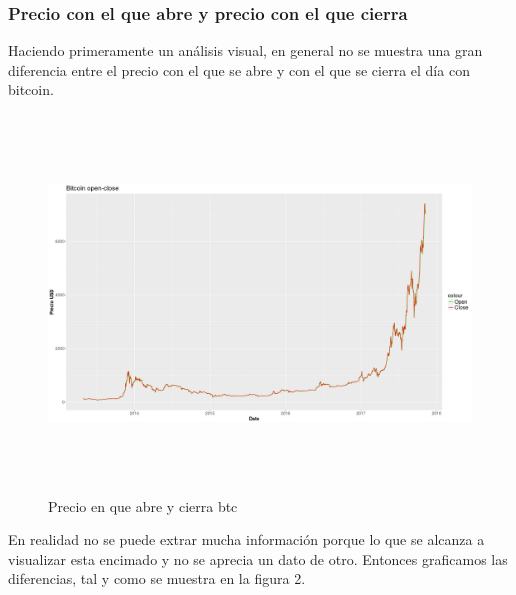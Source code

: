 \documentclass[12pt,letterpaper]{article}
\begin{document}
    \subsubsection*{Precio con el que abre y precio con el que cierra}

    Haciendo primeramente un an\'alisis visual, en general no se muestra una gran diferencia entre el precio con el que se abre y con el que se cierra el día con bitcoin.
    \\
    
    \begin{figure}
        \centering

        \includegraphics[width = 18cm, height = 10cm]{btc/date_vs_open-close}

        \caption{Precio en que abre y cierra btc}
    \end{figure}

    En realidad no se puede extrar mucha informaci\'on porque lo que se alcanza a visualizar esta encimado y no se aprecia un dato de otro. Entonces graficamos las diferencias, tal y como se muestra en la figura 2.
\end{document}
